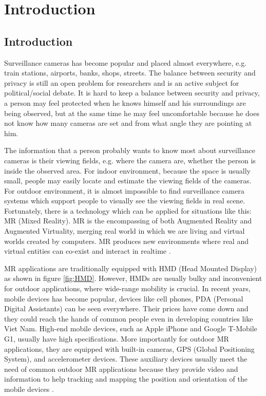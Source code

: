 \chapter{Introduction} %
\label{Chapter1}

\section{Introduction}

Surveillance cameras has become popular and placed almost everywhere, e.g. train stations, airports, banks, shops, streets. The balance between security and privacy is still an open problem for researchers and is an active subject for political/social debate. It is hard to keep a balance between security and privacy, a person may feel protected when he knows himself and his surroundings are being observed, but at the same time he may feel uncomfortable because he does not know how many cameras are set and from what angle they are pointing at him.

The information that a person probably wants to know most about surveillance cameras is their viewing fields, e.g. where the camera are, whether the person is inside the observed area. For indoor environment, because the space is usually small, people may easily locate and estimate the viewing fields of the cameras. For outdoor environment, it is almost impossible to find surveillance camera systems which support people to visually see the viewing fields in real scene. Fortunately, there is a technology which can be applied for situations like this: MR (Mixed Reality). MR is the encompassing of both Augmented Reality and Augmented Virtuality, merging real world in which we are living and virtual worlds created by computers. MR produces new environments where real and virtual entities can co-exist and interact in realtime \citep{Reference3}.

MR applications are traditionally equipped with HMD (Head Mounted Display) as shown in figure \ref{fig:HMD}. However, HMDs are usually bulky and inconvenient for outdoor applications, where wide-range mobility is crucial. In recent years, mobile devices has become popular, devices like cell phones, PDA (Personal Digital Assistants) can be seen everywhere. Their prices have come down and they could reach the hands of common people even in developing countries like Viet Nam. High-end mobile devices, such as Apple iPhone and Google T-Mobile G1, usually have high specifications. More importantly for outdoor MR applications, they are equipped with built-in cameras, GPS (Global Positioning System), and accelerometer devices. These auxiliary devices usually meet the need of common outdoor MR applications because they provide video and information to help tracking and mapping the position and orientation of the mobile devices \citep{Reference2} \citep{Reference4}.

